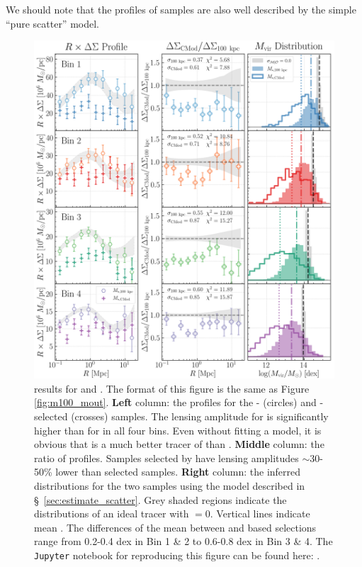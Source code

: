 \documentclass[fleqn,usenatbib,useAMS]{mnras}
\begin{document}
    We should note that the \dsigma{} profiles of \masap{} samples are also well described
    by the simple ``pure scatter'' model.
    
\begin{figure}
    \centering
    \includegraphics[width=\textwidth]{figure/fig_7}
    \caption{\topn{} results for  and \mcmodel{}. 
        The format of this figure is the same as Figure \ref{fig:m100_mout}. 
        \textbf{Left} column: the \rdsigma{}
        profiles for the - (circles) and \mcmodel{}-selected (crosses) samples. 
        The lensing amplitude for  is significantly higher than for \mcmodel{} in all
        four bins. 
        Even without fitting a model, it is obvious that  is a much better tracer of
        \mvir{} than \mcmodel{}. 
        \textbf{Middle} column: the ratio of \dsigma{} profiles. 
        Samples selected by \mcmodel{} have lensing amplitudes $\sim$30-50\% lower than 
        selected samples. 
        \textbf{Right} column: the inferred \mvir{} distributions for the two samples using the
        model described in \S\ \ref{sec:estimate_scatter}.
        Grey shaded regions indicate the \mvir{} distributions of an ideal tracer with
        \sigmh{}$=0$. 
        Vertical lines indicate mean \mvir{}. 
        The differences of the mean \mvir{} between \mcmodel{} and  based selections
        range from 0.2-0.4 dex in Bin 1 \& 2 to 0.6-0.8 dex in Bin 3 \& 4.
        The \texttt{Jupyter} notebook for reproducing this figure can be found here:
        \href{https://github.com/dr-guangtou/jianbing/blob/master/notebooks/figure/fig7.ipynb}{\faGithub}.
        }
    \label{fig:m100_cmod}
\end{figure}
\end{document}
